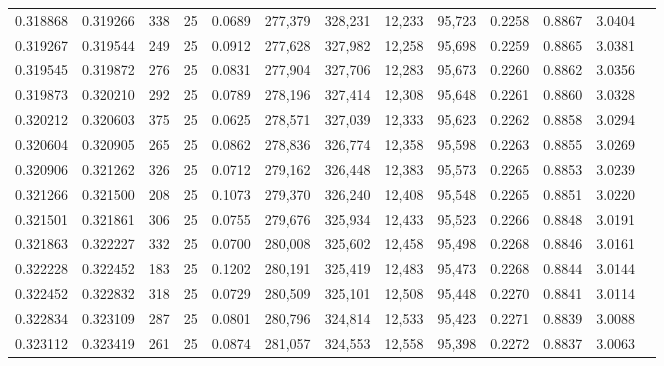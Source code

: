 \begin{tabular}{rrrrrrrrrrrrr}
0.318868 & 0.319266 &   338 &  25 &                                     0.0689 & 277,379 & 328,231 &  12,233 &  95,723 & 0.2258 & 0.8867 & 3.0404 \\
0.319267 & 0.319544 &   249 &  25 &                                     0.0912 & 277,628 & 327,982 &  12,258 &  95,698 & 0.2259 & 0.8865 & 3.0381 \\
0.319545 & 0.319872 &   276 &  25 &                                     0.0831 & 277,904 & 327,706 &  12,283 &  95,673 & 0.2260 & 0.8862 & 3.0356 \\
0.319873 & 0.320210 &   292 &  25 &                                     0.0789 & 278,196 & 327,414 &  12,308 &  95,648 & 0.2261 & 0.8860 & 3.0328 \\
0.320212 & 0.320603 &   375 &  25 &                                     0.0625 & 278,571 & 327,039 &  12,333 &  95,623 & 0.2262 & 0.8858 & 3.0294 \\
0.320604 & 0.320905 &   265 &  25 &                                     0.0862 & 278,836 & 326,774 &  12,358 &  95,598 & 0.2263 & 0.8855 & 3.0269 \\
0.320906 & 0.321262 &   326 &  25 &                                     0.0712 & 279,162 & 326,448 &  12,383 &  95,573 & 0.2265 & 0.8853 & 3.0239 \\
0.321266 & 0.321500 &   208 &  25 &                                     0.1073 & 279,370 & 326,240 &  12,408 &  95,548 & 0.2265 & 0.8851 & 3.0220 \\
0.321501 & 0.321861 &   306 &  25 &                                     0.0755 & 279,676 & 325,934 &  12,433 &  95,523 & 0.2266 & 0.8848 & 3.0191 \\
0.321863 & 0.322227 &   332 &  25 &                                     0.0700 & 280,008 & 325,602 &  12,458 &  95,498 & 0.2268 & 0.8846 & 3.0161 \\
0.322228 & 0.322452 &   183 &  25 &                                     0.1202 & 280,191 & 325,419 &  12,483 &  95,473 & 0.2268 & 0.8844 & 3.0144 \\
0.322452 & 0.322832 &   318 &  25 &                                     0.0729 & 280,509 & 325,101 &  12,508 &  95,448 & 0.2270 & 0.8841 & 3.0114 \\
0.322834 & 0.323109 &   287 &  25 &                                     0.0801 & 280,796 & 324,814 &  12,533 &  95,423 & 0.2271 & 0.8839 & 3.0088 \\
0.323112 & 0.323419 &   261 &  25 &                                     0.0874 & 281,057 & 324,553 &  12,558 &  95,398 & 0.2272 & 0.8837 & 3.0063 \\

\end{tabular}
